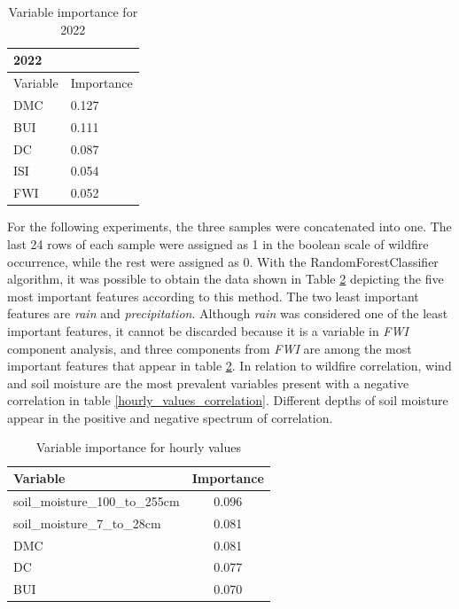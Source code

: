 \begin{table}[H]
	\caption{Variable importance for 2022}
	\label{importance_2022}
	\centering
	\begin{tabular}{ll}
		\hline
		2022     &            \\ \hline
		Variable & Importance \\
		DMC      & 0.127      \\
		BUI      & 0.111      \\
		DC       & 0.087      \\
		ISI      & 0.054      \\
		FWI      & 0.052     
	\end{tabular}
\end{table}

For the following experiments, the three samples were concatenated into one. The last 24 rows of each sample were assigned as 1 in the boolean scale of wildfire occurrence, while the rest were assigned as 0. With the RandomForestClassifier algorithm, it was possible to obtain the data shown in Table \ref{hourly_values} depicting the five most important features according to this method.
The two least important features are \textit{rain} and \textit{precipitation}. Although \textit{rain} was considered one of the least important features, it cannot be discarded because it is a variable in \textit{FWI} component analysis, and three components from \textit{FWI} are among the most important features that appear in table \ref{hourly_values}.
In relation to wildfire correlation, wind and soil moisture are the most prevalent variables present with a negative correlation in table \ref{hourly_values_correlation}. Different depths of soil moisture appear in the positive and negative spectrum of correlation.

\begin{table}[H]
	\caption{Variable importance for hourly values}
	\centering
	\label{hourly_values}
	\begin{tabular}{lc}
		\hline
		Variable                       & \multicolumn{1}{l}{Importance} \\ \hline
		soil\_moisture\_100\_to\_255cm                             & 0.096                          \\
		soil\_moisture\_7\_to\_28cm                            & 0.081                          \\
		DMC & 0.081                          \\
		DC                            & 0.077                          \\
		BUI              & 0.070                       
	\end{tabular}
\end{table}

